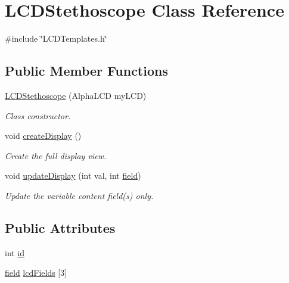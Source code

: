 \hypertarget{class_l_c_d_stethoscope}{\section{L\-C\-D\-Stethoscope Class Reference}
\label{class_l_c_d_stethoscope}
}


{\ttfamily \#include \char`\"{}L\-C\-D\-Templates.\-h\char`\"{}}

\subsection*{Public Member Functions}
\begin{DoxyCompactItemize}
\item 
\hyperlink{class_l_c_d_stethoscope_af9f8f2067a0b31bffa6fbc6a3db86287}{L\-C\-D\-Stethoscope} (Alpha\-L\-C\-D my\-L\-C\-D)
\begin{DoxyCompactList}\small\item\em Class constructor. \end{DoxyCompactList}\item 
void \hyperlink{class_l_c_d_stethoscope_a2641dd844d4070d6f498ba20c04cdfac}{create\-Display} ()
\begin{DoxyCompactList}\small\item\em Create the full display view. \end{DoxyCompactList}\item 
void \hyperlink{class_l_c_d_stethoscope_a4e5adf113971de39ff817b977ceb12b0}{update\-Display} (int val, int \hyperlink{_l_c_d_templates_8h_a20a49e010fbfc3a43959f12d92e01bb6}{field})
\begin{DoxyCompactList}\small\item\em Update the variable content field(s) only. \end{DoxyCompactList}\end{DoxyCompactItemize}
\subsection*{Public Attributes}
\begin{DoxyCompactItemize}
\item 
int \hyperlink{class_l_c_d_stethoscope_a865d5b5da67eb0841c34b1a436ef28ba}{id}
\item 
\hyperlink{_l_c_d_templates_8h_a20a49e010fbfc3a43959f12d92e01bb6}{field} \hyperlink{class_l_c_d_stethoscope_ad36003e685beee5f2268fd4ef1f0db8c}{lcd\-Fields} \mbox{[}3\mbox{]}
\end{DoxyCompactItemize}
